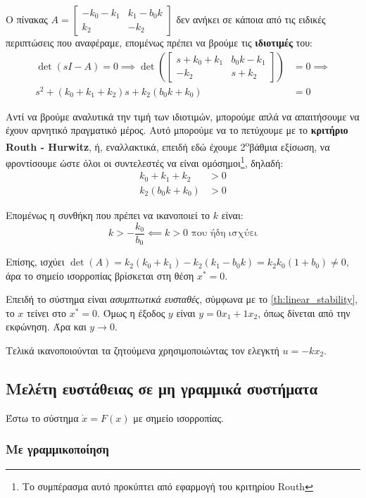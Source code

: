 \documentclass[11pt,a4paper,notitlepage,fleqn]{article}
\begin{document}
\begin{exercise}[Παράδειγμα]
	Ο πίνακας \( A=\left[\begin{matrix}
	-k_0 - k_1 & k_1-b_0k \\
	k_2 & -k_2
	\end{matrix}\right] \) δεν ανήκει σε κάποια από τις ειδικές περιπτώσεις
	που αναφέραμε, επομένως πρέπει να βρούμε τις \textbf{ιδιοτιμές} του:
	\begin{align*}
	\det(sI-A) = 0 \implies \det\left(\left[\begin{matrix}
	s+k_0+k_1 & b_0k-k_1 \\ -k_2 & s+k_2 \end{matrix}
	\right]\right) &= 0 \implies \\
	s^2 + (k_0+k_1+k_2)s + k_2(b_0k + k_0) &= 0
	\end{align*}
	
	Αντί να βρούμε αναλυτικά την τιμή των ιδιοτιμών, μπορούμε απλά να
	απαιτήσουμε να έχουν αρνητικό πραγματικό μέρος. Αυτό μπορούμε να το
	πετύχουμε με το \textbf{κριτήριο Routh - Hurwitz}, ή, εναλλακτικά, επειδή
	εδώ έχουμε 2\textsuperscript{o}βάθμια εξίσωση, να φροντίσουμε ώστε όλοι
	οι συντελεστές να είναι ομόσημοι\footnote{Το συμπέρασμα αυτό προκύπτει από εφαρμογή του κριτηρίου Routh}, δηλαδή:
	\begin{align*}
		k_0+k_1+k_2 &> 0\\
		k_2(b_0k+k_0) &> 0
	\end{align*}
	
	Επομένως η συνθήκη που πρέπει να ικανοποιεί το \( k \) είναι:
	\[
	k > -\frac{k_0}{b_0} \impliedby k>0 \text{ που ήδη ισχύει}
	\]
	
	Επίσης, ισχύει \( \det(A) = k_2(k_0+k_1)-k_2(k_1-b_0k) = k_2k_0(1+b_0) \neq 0 \), άρα το σημείο ισορροπίας βρίσκεται στη θέση \( x^* = 0 \).

	Επειδή το σύστημα είναι \textit{ασυμπτωτικά ευσταθές}, σύμφωνα
	με το \autoref{th:linear_stability}, το
	\( x \) τείνει στο \( x^* = 0 \). Όμως η έξοδος \( y \) είναι \( y=0x_1 + 1x_2 \), όπως δίνεται από την εκφώνηση.
	Άρα και \( y\to 0 \).
	
	Τελικά ικανοποιούνται τα ζητούμενα χρησιμοποιώντας τον ελεγκτή \( u=-kx_2 \).
\end{exercise}

\subsection{Μελέτη ευστάθειας σε μη γραμμικά συστήματα}
Έστω το σύστημα \( \dot x = F(x) \) με σημείο ισορροπίας.

\subsubsection{Με γραμμικοποίηση}
\end{document}
